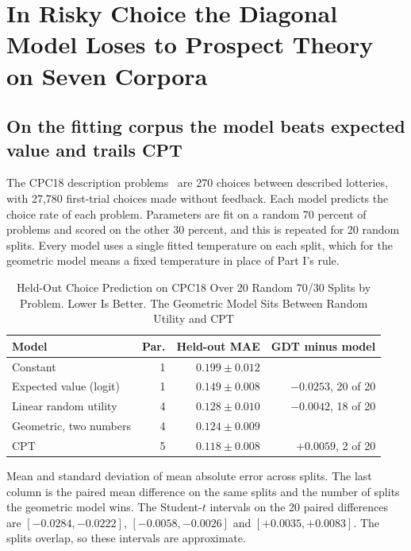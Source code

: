 \documentclass[journal]{IEEEtran}
\begin{document}
\section{In Risky Choice the Diagonal Model Loses to Prospect Theory on Seven Corpora}
\label{sec:risky}

\subsection{On the fitting corpus the model beats expected value and trails CPT}
The CPC18 description problems~\cite{erev2017,cpc18data} are 270 choices between described lotteries, with 27{,}780 first-trial choices made without feedback.
Each model predicts the choice rate of each problem.
Parameters are fit on a random 70 percent of problems and scored on the other 30 percent, and this is repeated for 20 random splits.
Every model uses a single fitted temperature on each split, which for the geometric model means a fixed temperature in place of Part I's rule.

\begin{table}[!t]
\renewcommand{\arraystretch}{1.15}
\caption{Held-Out Choice Prediction on CPC18 Over 20 Random 70/30 Splits by Problem. Lower Is Better. The Geometric Model Sits Between Random Utility and CPT}
\label{tab:cpc18}
\centering
\footnotesize
\begin{tabular}{@{}l r r r@{}}
\toprule
\textbf{Model} & \textbf{Par.} & \textbf{Held-out MAE} & \textbf{GDT minus model} \\
\midrule
Constant                 & 1 & $0.199 \pm 0.012$ & \\
Expected value (logit)   & 1 & $0.149 \pm 0.008$ & $-0.0253$, 20 of 20 \\
Linear random utility    & 4 & $0.128 \pm 0.010$ & $-0.0042$, 18 of 20 \\
Geometric, two numbers   & 4 & $0.124 \pm 0.009$ & \\
CPT                      & 5 & $0.118 \pm 0.008$ & $+0.0059$, 2 of 20 \\
\bottomrule
\end{tabular}
\begin{flushleft}
\footnotesize{Mean and standard deviation of mean absolute error across splits. The last column is the paired mean difference on the same splits and the number of splits the geometric model wins. The Student-$t$ intervals on the 20 paired differences are $[-0.0284,-0.0222]$, $[-0.0058,-0.0026]$ and $[+0.0035,+0.0083]$. The splits overlap, so these intervals are approximate.}
\end{flushleft}
\end{table}
\end{document}
